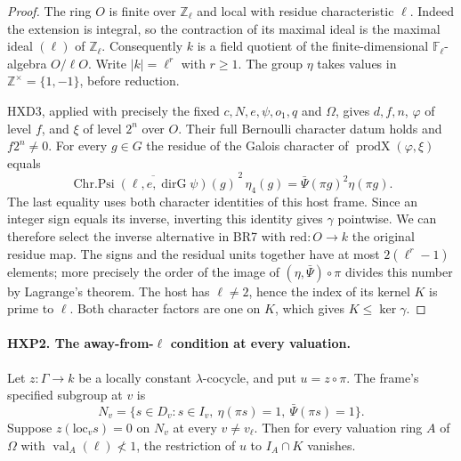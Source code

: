 \begin{proof}
The ring $O$ is finite over $\mathbb Z_\ell$ and local with residue
characteristic $\ell$. Indeed the extension is integral, so
the contraction of its maximal ideal is the maximal ideal
$(\ell)$ of $\mathbb Z_\ell$. Consequently $k$ is a field quotient
of the finite-dimensional $\mathbb F_\ell$-algebra $O/\ell O$.
Write $|k|=\ell^r$ with $r\ge1$. The group $\eta$ takes values in
$\mathbb Z^\times=\{1,-1\}$, before reduction.

HXD3, applied with precisely the fixed $c,N,e,\psi,o_1,q$ and
$\Omega$, gives $d,f,n$, $\varphi$ of level $f$, and $\xi$ of level
$2^n$ over $O$. Their full Bernoulli character datum holds and
$f2^n\ne0$. For every $g\in G$ the residue of the Galois character of
$\operatorname{prodX}(\varphi,\xi)$ equals
\[
    \overline{\operatorname{Chr.Psi}(\ell,e,\operatorname{dirG}\psi)(g)}^{\,2}
       \,\eta_4(g)
      =\bar\Psi(\pi g)^2\eta(\pi g).
\]
The last equality uses both character identities of this host frame.
Since an integer sign equals its inverse, inverting this identity gives
$\gamma$ pointwise. We can therefore select the inverse alternative in
BR7 with $\mathrm{red}:O\to k$ the original residue map.
The signs and the residual units together have at most
$2(\ell^r-1)$ elements; more precisely the order of the image of
$(\eta,\bar\Psi)\circ\pi$ divides this number by Lagrange's theorem.
The host has $\ell\ne2$, hence the index of its kernel $K$ is prime
to $\ell$. Both character factors are one on $K$, which gives
$K\le\ker\gamma$.
\end{proof}

\paragraph{HXP2. The away-from-$\ell$ condition at every valuation.}
\label{claim:HXP2}
Let $z:\Gamma\to k$ be a locally constant $\lambda$-cocycle, and put
$u=z\circ\pi$. The frame's specified subgroup at $v$ is
\[
 N_v=\{s\in D_v : s\in I_v,\ \eta(\pi s)=1,\
                                     \bar\Psi(\pi s)=1\}.
\]
Suppose $z(\mathrm{loc}_v s)=0$ on $N_v$ at every $v\ne v_\ell$.
Then for every valuation ring $A$ of $\Omega$ with
$\operatorname{val}_A(\ell)\not<1$, the restriction of $u$ to
$I_A\cap K$ vanishes.

